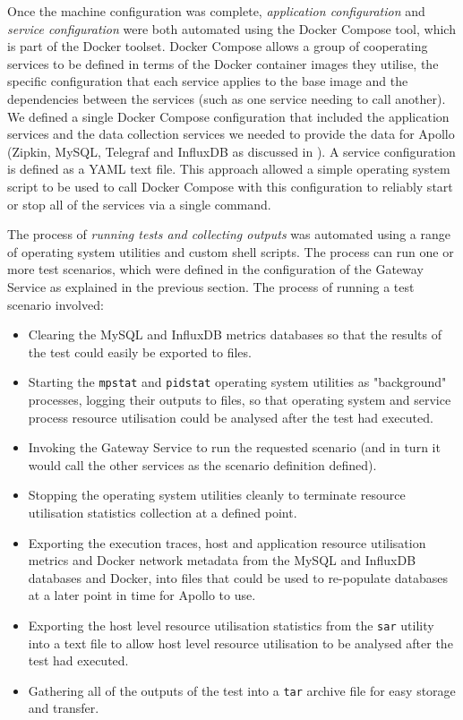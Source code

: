 Once the machine configuration was complete, \emph{application configuration} and \emph{service configuration} were both automated using the Docker Compose tool, which is part of the Docker toolset.  Docker Compose allows a group of cooperating services to be defined in terms of the Docker container images they utilise, the specific configuration that each service applies to the base image and the dependencies between the services (such as one service needing to call another).  We defined a single Docker Compose configuration that included the application services and the data collection services we needed to provide the data for Apollo (Zipkin, MySQL, Telegraf and InfluxDB as discussed in ).  A service configuration is defined as a YAML text file.  This approach allowed a simple operating system script to be used to call Docker Compose with this configuration to reliably start or stop all of the services via a single command.

The process of \emph{running tests and collecting outputs} was automated using a range of operating system utilities and custom shell scripts.  The process can run one or more test scenarios, which were defined in the configuration of the Gateway Service as explained in the previous section.  The process of running a test scenario involved:
\begin{itemize}
	\item Clearing the MySQL and InfluxDB metrics databases so that the results of the test could easily be exported to files.
	\item Starting the \texttt{mpstat} and \texttt{pidstat} operating system utilities as "background" processes, logging their outputs to files, so that operating system and service process resource utilisation could be analysed after the test had executed.
	\item Invoking the Gateway Service to run the requested scenario (and in turn it would call the other services as the scenario definition defined).
	\item Stopping the operating system utilities cleanly to terminate resource utilisation statistics collection at a defined point.
	\item Exporting the execution traces, host and application resource utilisation metrics and Docker network metadata from the MySQL and InfluxDB databases and Docker, into files that could be used to re-populate databases at a later point in time for Apollo to use.
	\item Exporting the host level resource utilisation statistics from the \texttt{sar} utility into a text file to allow host level resource utilisation to be analysed after the test had executed.
	\item Gathering all of the outputs of the test into a \texttt{tar} archive file for easy storage and transfer.
\end{itemize}

